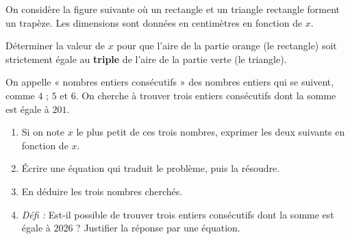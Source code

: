 \documentclass[a4paper]{book}
\begin{document}
    \begin{exercice}
        On considère la figure suivante où un rectangle et un triangle rectangle forment un trapèze. Les dimensions sont données en centimètres en fonction de $x$.
        
        \begin{center}
        \end{center}
        
        Déterminer la valeur de $x$ pour que l'aire de la partie orange (le rectangle) soit strictement égale au \textbf{triple} de l'aire de la partie verte (le triangle).
    \end{exercice}

    \begin{exercice}
        On appelle « nombres entiers consécutifs » des nombres entiers qui se suivent, comme $4$ ; $5$ et $6$.
        On cherche à trouver trois entiers consécutifs dont la somme est égale à $201$.
        
        \begin{enumerate}
            \item Si on note $x$ le plus petit de ces trois nombres, exprimer les deux suivants en fonction de $x$.
            \item Écrire une équation qui traduit le problème, puis la résoudre.
            \item En déduire les trois nombres cherchés.
            \item \textit{Défi :} Est-il possible de trouver trois entiers consécutifs dont la somme est égale à $2026$ ? Justifier la réponse par une équation.
        \end{enumerate}
    \end{exercice}
    
\end{document}
